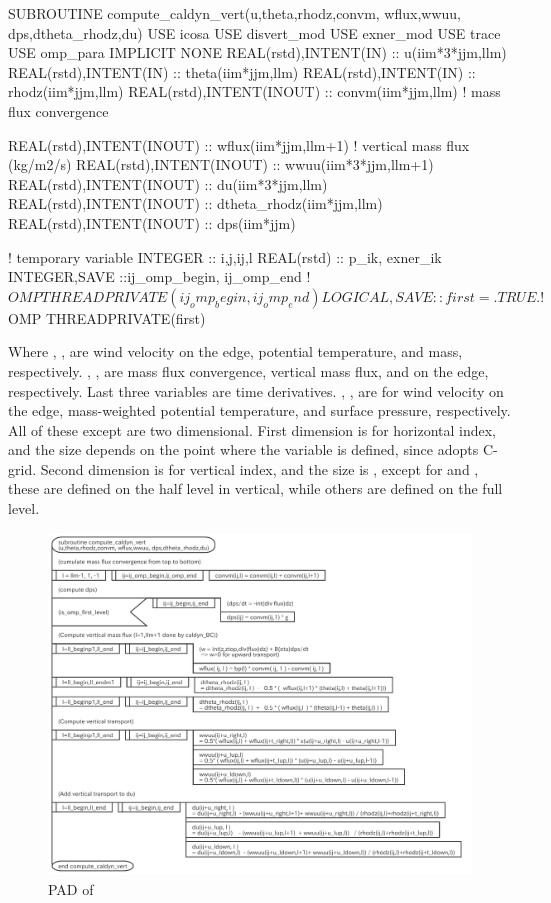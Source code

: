 \begin{LstF90}[%
caption={Definition part of \src{compute_caldyn_vert}},%
label={l:definition_comp_caldyn_vert}%
]
SUBROUTINE compute_caldyn_vert(u,theta,rhodz,convm, wflux,wwuu, dps,dtheta_rhodz,du)
  USE icosa
  USE disvert_mod
  USE exner_mod
  USE trace
  USE omp_para
  IMPLICIT NONE
    REAL(rstd),INTENT(IN)  :: u(iim*3*jjm,llm)
    REAL(rstd),INTENT(IN)  :: theta(iim*jjm,llm)
    REAL(rstd),INTENT(IN)  :: rhodz(iim*jjm,llm)
    REAL(rstd),INTENT(INOUT)  :: convm(iim*jjm,llm)  ! mass flux convergence

    REAL(rstd),INTENT(INOUT) :: wflux(iim*jjm,llm+1) ! vertical mass flux (kg/m2/s)
    REAL(rstd),INTENT(INOUT) :: wwuu(iim*3*jjm,llm+1)
    REAL(rstd),INTENT(INOUT) :: du(iim*3*jjm,llm)
    REAL(rstd),INTENT(INOUT) :: dtheta_rhodz(iim*jjm,llm)
    REAL(rstd),INTENT(INOUT) :: dps(iim*jjm)

! temporary variable
    INTEGER :: i,j,ij,l
    REAL(rstd) :: p_ik, exner_ik
    INTEGER,SAVE ::ij_omp_begin, ij_omp_end
!$OMP THREADPRIVATE(ij_omp_begin, ij_omp_end)
    LOGICAL,SAVE :: first=.TRUE.
!$OMP THREADPRIVATE(first)
\end{LstF90}
%
Where , ,  are wind velocity on the edge,
potential temperature, and mass, respectively.
, ,  are mass flux convergence, vertical mass flux,
and  on the edge, respectively.
%
Last three variables are time derivatives.
, ,  are for wind velocity on the edge,
mass-weighted potential temperature, and surface pressure, respectively.
%
All of these except  are two dimensional.
%
First dimension is for horizontal index, and the size depends on the
point where the variable is defined, since \DYNAMICO adopts C-grid.
%
Second dimension is for vertical index, and the size is ,
except  for  and , these are defined on
the half level in vertical, while others are defined on the full level.

\begin{figure}[tbp]
 \centering
 \includegraphics[scale=.5]{figs/caldyn_vert.pdf}
 \caption{PAD of }
 \label{f:pad_comp_caldyn_vert}
\end{figure}

